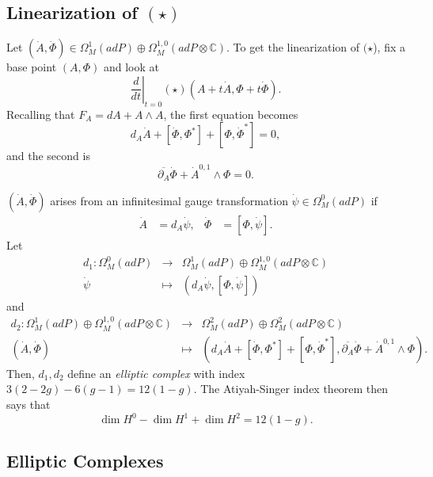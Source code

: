 \documentclass[oneside,english]{amsbook}
\numberwithin{section}{chapter}
\numberwithin{equation}{section}
\numberwithin{figure}{section}
\theoremstyle{plain}
\theoremstyle{definition}
\theoremstyle{remark}
\theoremstyle{definition}
\theoremstyle{definition}
\theoremstyle{plain}
\begin{document}
\subsection{Linearization of $(\star)$}

Let $\left(\dot{A},\dot{\Phi}\right)\in\Omega_{M}^{1}\left(adP\right)\oplus\Omega_{M}^{1,0}\left(adP\otimes\mathbb{C}\right)$.
To get the linearization of $(\star$), fix a base point $\left(A,\Phi\right)$
and look at
\[
\left.\frac{d}{dt}\right|_{t=0}\left(\star\right)\left(A+t\dot{A},\Phi+t\dot{\Phi}\right).
\]
Recalling that $F_{A}=dA+A\wedge A$, the first equation becomes
\[
d_{A}\dot{A}+\left[\dot{\Phi},\Phi^{*}\right]+\left[\Phi,\dot{\Phi}^{*}\right]=0,
\]
and the second is
\[
\overline{\partial_{A}}\dot{\Phi}+\dot{A}^{0,1}\wedge\Phi=0.
\]


$\left(\dot{A},\dot{\Phi}\right)$ arises from an infinitesimal gauge
transformation $\dot{\psi}\in\Omega_{M}^{0}\left(adP\right)$ if
\begin{align*}
\dot{A} & =d_{A}\dot{\psi}, & \dot{\Phi} & =\left[\Phi,\dot{\psi}\right].
\end{align*}
Let
\begin{eqnarray*}
d_{1}:\Omega_{M}^{0}\left(adP\right) & \longrightarrow & \Omega_{M}^{1}\left(adP\right)\oplus\Omega_{M}^{1,0}\left(adP\otimes\mathbb{C}\right)\\
\dot{\psi} & \mapsto & \left(d_{A}\dot{\psi},\left[\Phi,\dot{\psi}\right]\right)
\end{eqnarray*}
and
\begin{eqnarray*}
d_{2}:\Omega_{M}^{1}\left(adP\right)\oplus\Omega_{M}^{1,0}\left(adP\otimes\mathbb{C}\right) & \longrightarrow &
\Omega_{M}^{2}\left(adP\right)\oplus\Omega_{M}^{2}\left(adP\otimes\mathbb{C}\right)\\
\left(\dot{A},\dot{\Phi}\right) & \mapsto &
\left(d_{A}\dot{A}+\left[\dot{\Phi},\Phi^{*}\right]+\left[\Phi,\dot{\Phi}^{*}\right],\overline{\partial_{A}}\dot{\Phi}+\dot{A}^{0,1}\wedge\Phi\right).
\end{eqnarray*}
Then, $d_{1},d_{2}$ define an \emph{elliptic complex} with index
$3\left(2-2g\right)-6\left(g-1\right)=12\left(1-g\right)$. The Atiyah-Singer
index theorem then says that
\[
\dim H^{0}-\dim H^{1}+\dim H^{2}=12\left(1-g\right).
\]



\subsection{Elliptic Complexes}
\end{document}
